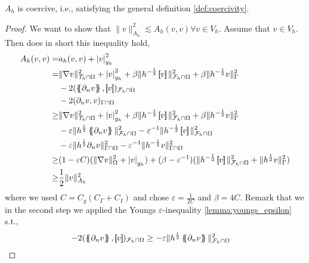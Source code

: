 \begin{lemma}
    $A_{h}$ is coercive, i.e., satisfying the general definition \ref{def:coercivity}.
\end{lemma}
\begin{proof}
We want to show that $  \| v \|_{A_{h}}^{2}   \lesssim A_{h}( v,v) \forall v \in V_{h} $.
    Assume that $v \in V_{h} $. Then does in short this inequality hold,
\[
    \begin{split}
A_{h}( v, v)   =& a_{h}( v, v) + \abs{ v }  _{g_{h}}^{2} \\
=&  \| \nabla v \|_{  \mathcal{T}_{h} \cap \Omega }^{ 2 } + \abs{v  }  _{ g_{h} }^{ 2 } + \beta \| h^{-\frac{1}{2}} \jump{ v }   \|_{\mathcal{F} _{h} \cap \Omega   }^{  2}   + \beta \| h^{-\frac{1}{2}}  v    \|_{ \Gamma}^{  2}
\\ & - 2( \mean{ \partial _{n} v  },  \jump{ v })_{\mathcal{F} _{h} \cap \Omega }
\\ & - 2 ( \partial _{n} v,v)_{\Gamma \cap \Omega }     \\
\ge  &  \| \nabla v \|_{  \mathcal{T}_{h} \cap \Omega }^{ 2 } + \left\lvert v \right\rvert_{ g_{h} }^{ 2 } + \beta \| h^{-\frac{1}{2}} \jump{ v }   \|_{\mathcal{F} _{h} \cap \Omega   }^{2  }   + \beta \| h^{-\frac{1}{2}}  v    \|_{ \Gamma}^{  2}
\\ & - \varepsilon \| h^{\frac{1}{2}}  \mean{  \partial _{n} v}      \|_{ \mathcal{F} _{h} \cap \Omega  }^{2  } - \varepsilon ^{-1} \| h^{-\frac{1}{2}} \jump{ v }   \|_{\mathcal{F} _{h} \cap \Omega   }^{ 2 }
\\ & - \varepsilon \| h^{\frac{1}{2}} \partial _{n} v \|_{ \Gamma \cap \Omega  }^{2  } -  \varepsilon ^{-1} \| h^{-\frac{1}{2}} v \|_{  \Gamma \cap  \Omega }^{ 2 } \\
\ge & ( 1-\varepsilon C)  ( \| \nabla v \|_{\Omega   }^{2  } + \left\lvert v \right\rvert _{g_{h}}   ) + ( \beta - \varepsilon ^{-1} ) ( \| h^{-\frac{1}{2}} \jump{ v }   \|_{ \mathcal{F} _{h}\cap  \Omega  }^{ 2 } + \| h^{\frac{1}{2}} v \|_{\Gamma
}^{  2}  )    \\
\ge & \frac{1}{2} \| v \|_{ A_{h} }^{ 2 }
    \end{split}
\]
where we used $C= C_{g} ( C_{\Gamma } + C_{I}) $ and chose $\varepsilon = \frac{1}{2C}$ and $\beta  = 4C$.
Remark that we in the second step we applied the Youngs $\varepsilon $-inequality \ref{lemma:youngs_epsilon} s.t.,
 \[
     \begin{split}
         - 2( \mean{ \partial _{n} v  },  \jump{ v })_{\mathcal{F} _{h} \cap \Omega } &\ge - \varepsilon \| h^{\frac{1}{2}}  \mean{  \partial _{n} v}      \|_{ \mathcal{F} _{h} \cap \Omega  }^{2  }

\end{split}\]
\end{proof}
